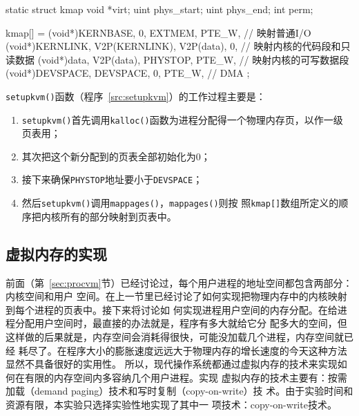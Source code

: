 \documentclass{swfuthesism}
\begin{document}
\begin{listing}%
  \begin{codeblock}
\begin{ccode}
static struct kmap {
  void *virt;
  uint phys_start;
  uint phys_end;
  int perm;
}

kmap[] = {
  {(void*)KERNBASE, 0, EXTMEM, PTE_W}, // 映射普通I/O
  {(void*)KERNLINK, V2P(KERNLINK), V2P(data), 0}, // 映射内核的代码段和只读数据
  {(void*)data, V2P(data), PHYSTOP, PTE_W}, // 映射内核的可写数据段
  {(void*)DEVSPACE, DEVSPACE, 0, PTE_W}, // DMA
};
\end{ccode}
  \end{codeblock}
  \label{src:kmap}
\end{listing}

\texttt{setupkvm()}函数（程序~\ref{src:setupkvm}）的工作过程主要是：
\begin{enumerate}
\item \texttt{setupkvm()}首先调用\texttt{kalloc()}函数为进程分配得一个物理内存页，以作一级
  页表用；
\item 其次把这个新分配到的页表全部初始化为0；
\item 接下来确保\texttt{PHYSTOP}地址要小于\texttt{DEVSPACE}；
\item 然后\texttt{setupkvm()}调用\texttt{mappages()}，\texttt{mappages()}则按
  照\texttt{kmap[]}数组所定义的顺序把内核所有的部分映射到页表中。
\end{enumerate}

\subsection{虚拟内存的实现}

前面（第~\ref{sec:procvm}节）已经讨论过，每个用户进程的地址空间都包含两部分：内核空间和用户
空间。在上一节里已经讨论了如何实现把物理内存中的内核映射到每个进程的页表中。接下来将讨论如
何实现进程用户空间的内存分配。在给进程分配用户空间时，最直接的办法就是，程序有多大就给它分
配多大的空间，但这样做的后果就是，内存空间会消耗得很快，可能没加载几个进程，内存空间就已经
耗尽了。在程序大小的膨胀速度远远大于物理内存的增长速度的今天这种方法显然不具备很好的实用性。
所以，现代操作系统都通过虚拟内存的技术来实现如何在有限的内存空间内多容纳几个用户进程。实现
虚拟内存的技术主要有：按需加载（demand paging）技术和写时复制（copy-on-write）技
术\cite{silberschatz11essentials}。由于实验时间和资源有限，本实验只选择实验性地实现了其中一
项技术：copy-on-write技术。
\end{document}
